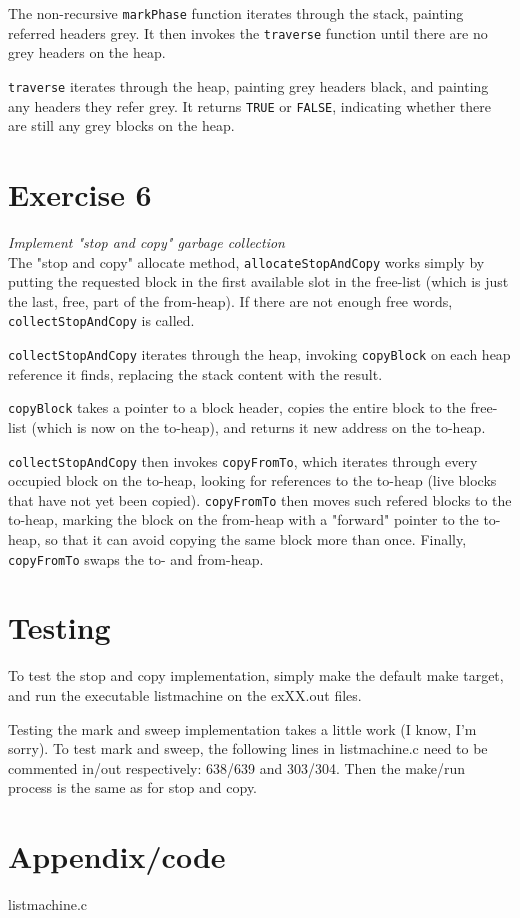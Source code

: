 \documentclass[a4paper, titlepage]{article}
\begin{document}
The non-recursive \texttt{markPhase} function iterates through the stack,
painting referred headers grey. It then invokes the \texttt{traverse} function
until there are no grey headers on the heap.

\texttt{traverse} iterates through the heap, painting grey headers black, and
painting any headers they refer grey.
It returns \texttt{TRUE} or \texttt{FALSE}, indicating whether there are still
any grey blocks on the heap.

\section{Exercise 6}
\label{sec:Ex6}
\textit{Implement "stop and copy" garbage collection}\\

The "stop and copy" allocate method, \texttt{allocateStopAndCopy} works simply
by putting the requested block in the first available slot in the free-list
(which is just the last, free, part of the from-heap). If there are not enough
free words, \texttt{collectStopAndCopy} is called.

\texttt{collectStopAndCopy} iterates through the heap, invoking
\texttt{copyBlock} on each heap reference it finds, replacing the stack content
with the result.

\texttt{copyBlock} takes a pointer to a block header, copies the entire block to
the free-list (which is now on the to-heap), and returns it new address on the to-heap.

\texttt{collectStopAndCopy} then invokes \texttt{copyFromTo}, which iterates
through every occupied block on the to-heap, looking for references to the
to-heap (live blocks that have not yet been copied). \texttt{copyFromTo} then
moves such refered blocks to the to-heap, marking the block on the from-heap
with a "forward" pointer to the to-heap, so that it can avoid copying the same
block more than once.
Finally, \texttt{copyFromTo} swaps the to- and from-heap.

\section{Testing}
To test the stop and copy implementation, simply make the default make target,
and run the executable listmachine on the exXX.out files.

Testing the mark and sweep implementation takes a little work (I know, I'm
sorry). To test mark and sweep, the following lines in listmachine.c need to be
commented in/out respectively: 638/639 and 303/304. Then the make/run process
is the same as for stop and copy.

\pagebreak
\section{Appendix/code}
listmachine.c

\end{document}
